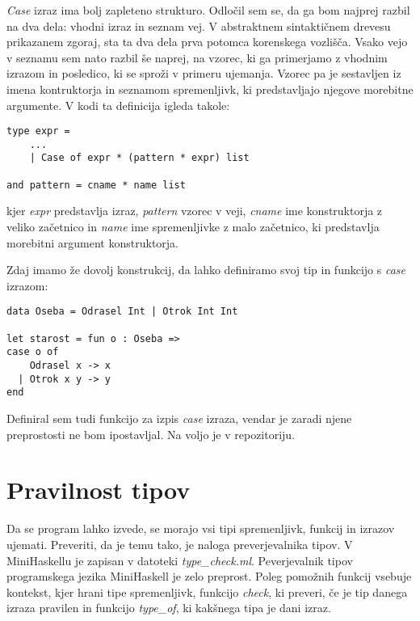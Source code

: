 \documentclass[12pt,a4paper,openany]{book}
\begin{document}
\emph{Case} izraz ima bolj zapleteno strukturo. Odločil sem se, da ga bom najprej razbil na dva dela: vhodni izraz in seznam vej. V abstraktnem sintaktičnem drevesu prikazanem zgoraj, 
sta ta dva dela prva potomca korenskega vozlišča. Vsako vejo v seznamu sem nato razbil še naprej, na vzorec, ki ga primerjamo z vhodnim izrazom in posledico, ki se sproži v primeru ujemanja. 
Vzorec pa je sestavljen iz imena kontruktorja in seznamom spremenljivk, ki predstavljajo njegove morebitne argumente. V kodi ta definicija igleda takole:
\begin{lstlisting}
type expr =
    ...
    | Case of expr * (pattern * expr) list

and pattern = cname * name list
\end{lstlisting}
kjer \emph{expr} predstavlja izraz, \emph{pattern} vzorec v veji, \emph{cname} ime konstruktorja z veliko začetnico in \emph{name} ime spremenljivke z malo začetnico, ki predstavlja morebitni 
argument konstruktorja. 

Zdaj imamo že dovolj konstrukcij, da lahko definiramo svoj tip in funkcijo s \emph{case} izrazom: 
\begin{lstlisting}
data Oseba = Odrasel Int | Otrok Int Int

let starost = fun o : Oseba => 
case o of 
    Odrasel x -> x 
  | Otrok x y -> y
end
\end{lstlisting}

Definiral sem tudi funkcijo za izpis \emph{case} izraza, vendar je zaradi njene preprostosti ne bom ipostavljal. Na voljo je v repozitoriju.

\section{Pravilnost tipov}
 Da se program lahko izvede, se morajo vsi tipi spremenljivk, funkcij in izrazov ujemati. Preveriti, da je temu tako, je naloga preverjevalnika tipov. V MiniHaskellu je zapisan v datoteki 
 \emph{type\_check.ml}. Peverjevalnik tipov programskega jezika MiniHaskell je zelo preprost. Poleg pomožnih funkcij vsebuje kontekst, kjer hrani tipe spremenljivk, funkcijo \emph{check}, 
 ki preveri, če je tip danega izraza pravilen in funkcijo \emph{type\_of}, ki kakšnega tipa je dani izraz.
 
\end{document}
